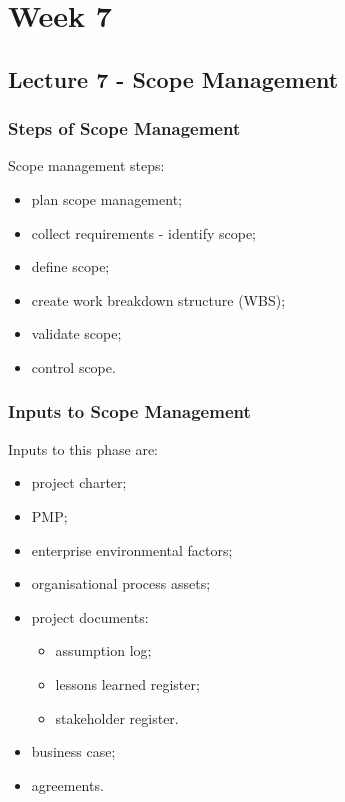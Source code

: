 \documentclass[journal]{IEEEtran}
\begin{document}
\section{Week 7}
\subsection{\textbf{Lecture 7 - Scope Management}}
\subsubsection{Steps of Scope Management}
Scope management steps:
\begin{itemize}
	\item plan scope management;
	\item collect requirements - identify scope;
	\item define scope;
	\item create work breakdown structure (WBS);
	\item validate scope;
	\item control scope.
\end{itemize}
\subsubsection{Inputs to Scope Management}
Inputs to this phase are:
\begin{itemize}
	\item project charter;
	\item PMP;
	\item enterprise environmental factors;
	\item organisational process assets;
	\item project documents:
	\begin{itemize}
		\item assumption log;
		\item lessons learned register;
		\item stakeholder register.
	\end{itemize}
	\item business case;
	\item agreements.
\end{itemize}
\end{document}
